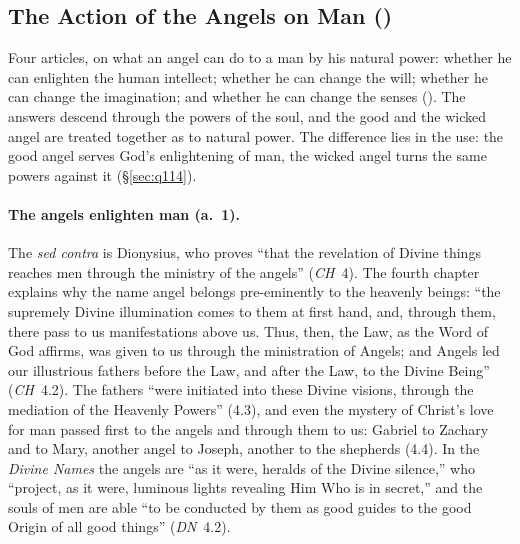 \sectionguard
\subsection{The Action of the Angels on Man ()}\label{sec:q111}

Four articles, on what an angel can do to a man by his natural power:
whether he can enlighten the human intellect; whether he can change the
will; whether he can change the imagination; and whether he can change the
senses (). The answers descend through the powers of the
soul, and the good and the wicked angel are treated together as to natural
power. The difference lies in the use: the good angel serves God's
enlightening of man, the wicked angel turns the same powers against it
(\S\ref{sec:q114}).

\paragraph{The angels enlighten man (a.~1).} The \emph{sed contra} is
Dionysius, who proves ``that the revelation of Divine things reaches men
through the ministry of the angels'' (\emph{CH}~4). The fourth chapter
explains why the name angel belongs pre-eminently to the heavenly
beings: ``the supremely Divine illumination comes to them at first hand,
and, through them, there pass to us manifestations above us. Thus, then,
the Law, as the Word of God affirms, was given to us through the
ministration of Angels; and Angels led our illustrious fathers before the
Law, and after the Law, to the Divine Being'' (\emph{CH}~4.2). The fathers
``were initiated into these Divine visions, through the mediation of the
Heavenly Powers'' (4.3), and even the mystery of Christ's love for man
passed first to the angels and through them to us: Gabriel to Zachary and
to Mary, another angel to Joseph, another to the shepherds (4.4). In the
\emph{Divine Names} the angels are ``as it were, heralds of the Divine
silence,'' who ``project, as it were, luminous lights revealing Him Who is
in secret,'' and the souls of men are able ``to be conducted by them as
good guides to the good Origin of all good things'' (\emph{DN}~4.2).

